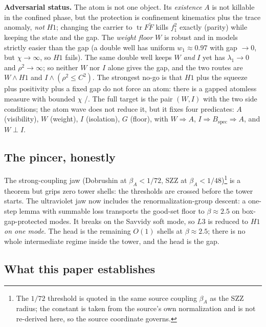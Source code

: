 \documentclass[11pt,a4paper]{article}
\newcommand{\labb}[2]{\fcolorbox{#1!35}{#1!8}{\textcolor{#1}{\textbf{\scriptsize #2}}}}
\newcommand{\LT}{\labb{cT}{T}}
\newcommand{\LN}{\labb{cN}{N}}
\begin{document}
\textbf{Adversarial status.} The atom is not one object. Its \emph{existence} $A$ is not killable in
the confined phase, but the protection is confinement kinematics plus the trace anomaly, \emph{not}
$H1$; changing the carrier to $\operatorname{tr}F\tilde F$ kills $f_1^2$ exactly (parity) while
keeping the state and the gap. The \emph{weight floor} $W$ is robust and in models strictly easier
than the gap (a double well has uniform $w_1\approx0.97$ with gap $\to0$, but $\chi\to\infty$, so
$H1$ fails). The same double well keeps $W$ \emph{and} $I$ yet has $\lambda_1\to0$ and
$\rho^2\to\infty$; so neither $W$ nor $I$ alone gives the gap, and the two routes are
$W\wedge H1$ and $I\wedge(\rho^2\le C^2)$. The strongest no-go is that $H1$ plus the squeeze plus
positivity plus a fixed gap do not force an atom: there is a gapped atomless measure with bounded
$\chi$ \LT/\LN. The full target is the pair $(W,I)$ with the two side conditions; the atom wave does
not reduce it, but it fixes four predicates: $A$ (visibility), $W$ (weight), $I$ (isolation), $G$
(floor), with $W\Rightarrow A$, $I\Rightarrow B_{\mathrm{spec}}\Rightarrow A$, and $W\perp I$.

\subsection{The pincer, honestly}

The strong-coupling jaw (Dobrushin at $\beta_A<1/72$, SZZ at $\beta_A<1/48$)\footnote{The $1/72$ threshold is quoted in the same source coupling $\beta_A$ as the SZZ radius; the constant is taken from the source's own normalization and is not re-derived here, so the source coordinate governs.} is a theorem but grips
zero tower shells: the thresholds are crossed before the tower starts. The ultraviolet jaw now
includes the renormalization-group descent: a one-step lemma with summable loss transports the
good-set floor to $\beta\approx2.5$ on box-gap-protected modes. It breaks on the Savvidy soft mode,
so $L3$ is reduced to $H1$ \emph{on one mode}. The head is the remaining $O(1)$ shells at
$\beta\approx2.5$; there is no whole intermediate regime inside the tower, and the head is the gap.

\subsection{What this paper establishes}
\end{document}
